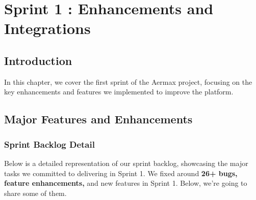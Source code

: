 \chapter{Sprint 1 : Enhancements and Integrations}

\section{Introduction}
In this chapter, we cover the first sprint of the Aermax project, focusing on the key enhancements and features we implemented to improve the platform.

\section{Major Features and Enhancements}

\subsection{Sprint Backlog Detail}
Below is a detailed representation of our sprint backlog, showcasing the major tasks we committed to delivering in Sprint 1. We fixed around \textbf{26+ bugs, feature enhancements,} and new features in Sprint 1. Below, we're going to share some of them.

